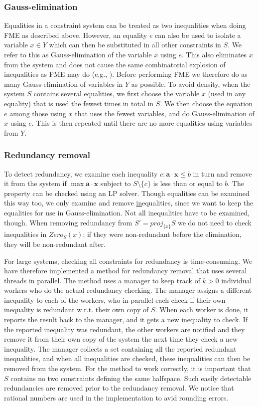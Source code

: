\documentclass[citeauthoryear]{llncs}
\newcommand{\mi}{\mathit}
\newcommand{\ve}{\mathbf}
\begin{document}
\subsubsection{Gauss-elimination} 
Equalities in a constraint system can be treated as two inequalities when doing FME as described above. However, an equality $e$ can also be used to isolate a variable $x\in Y$ which can then be substituted in all other constraints in $S$. We refer to this as Gauss-elimination of the variable $x$ using $e$. This also eliminates $x$ from the system and does not cause the same combinatorial explosion of inequalities as FME may do (e.g., \cite{duffin74,simon05}). Before performing FME we therefore do as many Gauss-elimination of variables in $Y$ as possible. To avoid density, when the system $S$ contains several equalities, we first choose the variable $x$ (used in any equality) that is used the fewest times in total in $S$. We then choose the equation $e$ among those using $x$ that uses the fewest variables, and do Gauss-elimination of $x$ using $e$.  This is then repeated until there are no more equalities using variables from $Y$.

\subsubsection{Redundancy removal} 
To detect redundancy, we examine each inequality $c: \ve{a}\cdot \ve{x}\leq b$ in turn and remove it from the system if $\max \ve{a}\cdot \ve{x}$ subject to $S\setminus\{c\}$ is less than or equal to $b$. The property can be checked using an LP solver. Though equalities can be examined this way too, we only examine and remove \underline{in}equalities, since we want to keep the equalities for use in Gauss-elimination. Not all inequalities have to be examined, though. When removing redundancy from $S' = \mi{proj}_{\{x\}}S$ we do not need to check inequalities in $\mi{Zero}_S(x)$; if they were non-redundant before the elimination, they will be non-redundant after.

For large systems, checking all constraints for redundancy is time-consuming. We have therefore implemented a method for redundancy removal that uses several threads in parallel. The method uses a manager to keep track of $k>0$ individual workers who do the actual redundancy checking.
The manager assigns a different inequality to each of the workers, who in parallel each check if their own inequality is redundant w.r.t. their own copy of $S$. When each worker is done, it reports the result back to the manager, and it gets a new inequality to check. If the reported inequality was redundant, the other workers are notified and they remove it from their own copy of the system the next time they check a new inequality. The manager collects a set containing all the reported redundant inequalities, and when all inequalities are checked, these inequalities can then be removed from the system. For the method to work correctly, it is important that $S$ contains no two constraints defining the same halfspace. Such easily detectable redundancies are removed prior to the redundancy removal. We notice that rational numbers are used in the implementation to avid rounding errors. 
\end{document}
